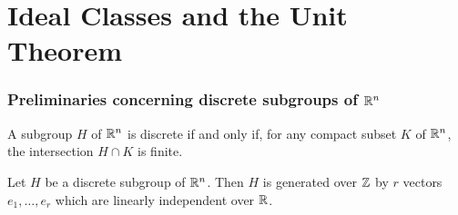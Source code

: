 \chapter{Ideal Classes and the Unit Theorem}

\subsection{Preliminaries concerning discrete subgroups of $\mathbb{R}^n$}

\begin{defintion}
A subgroup $H$ of $\mathbb{R}^n$ is discrete if and only if, for any compact subset $K$ of $\mathbb{R}^n$, the intersection $H\cap K$ is finite.
\end{defintion}

\begin{theorem}
  Let $H$ be a discrete subgroup of $\mathbb{R}^n$. Then $H$ is generated over $\mathbb{Z}$ by $r$ vectors $e_1,\ldots, e_r$ which are linearly independent over $\mathbb{R}$.
\end{theorem}

